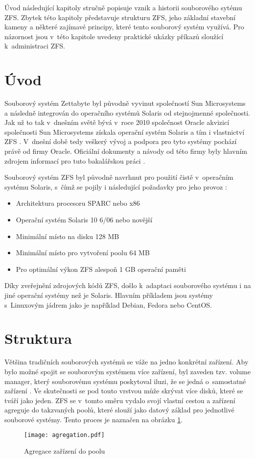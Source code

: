 Úvod následující kapitoly stručně popisuje vznik a historii souborového sytému ZFS. Zbytek této kapitoly představuje strukturu ZFS, jeho základní stavební kameny a některé zajímavé principy, které tento souborový systém využívá. Pro názornost jsou v~této kapitole uvedeny praktické ukázky příkazů sloužící k~administraci ZFS.

\section{Úvod}
    Souborový systém Zettabyte byl původně vyvinut společností Sun Microsystems a následně integrován do operačního systémů Solaris od stejnojmenné společnosti.
    Jak už to tak v~dnešním světě bývá v~roce 2010 společnost Oracle akvizicí společnosti Sun Microsystems získala operační systém Solaris a tím i vlastnictví ZFS \cite{suns}. V~dnešní době tedy veškerý vývoj a podpora pro tyto systémy pochází právě od firmy Oracle. Oficiální dokumenty a návody od této firmy byly hlavním zdrojem informací pro tuto bakalářskou práci \cite{guide}.

    Souborový systém ZFS byl původně navrhnut pro použití čistě v~operačním systému Solaris, s~čímž se pojily i následující požadavky pro jeho provoz \cite{requirements}:
    \begin{itemize}
      \item Architektura procesoru SPARC nebo x86
      \item Operační systém Solaris 10 6/06 nebo novější
      \item Minimální místo na disku 128 MB
      \item Minimální místo pro vytvoření poolu 64 MB
      \item Pro optimální výkon ZFS alespoň 1 GB operační paměti
    \end{itemize}

    Díky zveřejnění zdrojových kódů ZFS, došlo k~adaptaci souborového systému i na jiné operační systémy než je Solaris. Hlavním příkladem jsou systémy s~Linuxovým jádrem jako je například Debian, Fedora nebo CentOS.

\section{Struktura}
Většina tradičních souborových systémů se váže na jedno konkrétní zařízení. Aby bylo možné spojit se souborovým systémem více zařízení, byl zaveden tzv. volume manager, který souborovému systému poskytoval iluzi, že se jedná o~samostatné zařízení \cite{traditional}. Ve skutečnosti se pod touto vrstvou může skrývat více disků, které se tváří jako jeden. ZFS se v~tomto směru vydalo svojí vlastní cestou a zařízení agreguje do takzvaných poolů, které slouží jako datový základ pro jednotlivé souborové systémy. Tento proces je naznačen na obrázku \ref{agregation}.
\begin{figure}
    \centering
    \texttt{[image: agregation.pdf]}
    \caption{Agregace zařízení do poolu}
    \label{agregation}
\end{figure}
